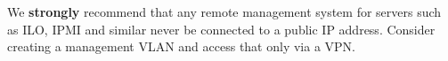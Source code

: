 

We \textbf{strongly} recommend that any remote management system for servers such as ILO, IPMI and similar never be connected to a public IP address.
Consider creating a management VLAN and access that only via a VPN.
